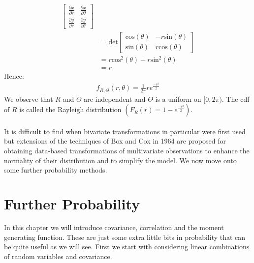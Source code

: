 \documentclass[,oneside]{article}
\begin{document}
\begin{enumerate}
\begin{align*}
\begin{bmatrix}
\frac{\partial x}{\partial r} & \frac{\partial x}{\partial \theta }\\
\frac{\partial y}{\partial r} & \frac{\partial y}{\partial \theta }
\end{bmatrix}\\
&= \text{det}
\begin{bmatrix}
 \text{cos}(\theta) & -r\text{sin}(\theta )\\
\text{sin}(\theta )& r\text{cos}(\theta)
\end{bmatrix}\\
&= r\text{cos}^2 (\theta)+ r\text{sin}^2 (\theta)\\
&=r
\end{align*}
Hence: 
\begin{align*}
f_{R,\Theta}(r,\theta )=\frac{1}{2\pi}re^{\frac{-r^2}{2}}
\end{align*}
We observe that $R$ and $\Theta$ are independent and $\Theta$ is a uniform on $[0,2\pi )$. The cdf of $R$ is called the Rayleigh distribution  $\left ( F_R(r)=1-e^{\frac{-r^2}{2}} \right )$.\\ \\
It is difficult to find when bivariate transformations in particular were first used but extensions of the techniques of Box and Cox in 1964 are proposed for obtaining data-based transformations of multivariate observations to enhance the normality of their distribution and to simplify the model. We now move onto some further probability methods.

\pagebreak
\section{Further Probability}
In this chapter we will introduce covariance, correlation and the moment generating function. These are just some extra little bits in probability that can be quite useful as we will see. First we start with considering linear combinations of random variables and covariance.

\end{enumerate}
\end{document}
